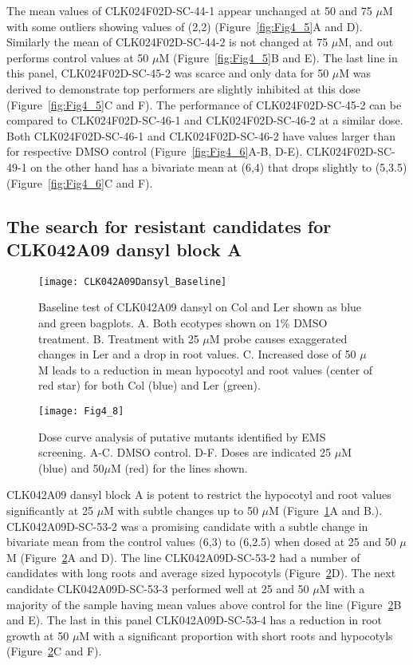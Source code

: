 The mean values of CLK024F02D-SC-44-1 appear unchanged at 50 and 75 $\mu$M with some outliers showing values of (2,2) (Figure~\ref{fig:Fig4_5}A and D). Similarly the mean of CLK024F02D-SC-44-2 is not changed at 75 $\mu$M, and out performs control values at 50 $\mu$M (Figure~\ref{fig:Fig4_5}B and E). The last line in this panel, CLK024F02D-SC-45-2 was scarce and only data for 50 $\mu$M was derived to demonstrate top performers are slightly inhibited at this dose (Figure~\ref{fig:Fig4_5}C and F). The performance of CLK024F02D-SC-45-2 can be compared to CLK024F02D-SC-46-1 and CLK024F02D-SC-46-2 at a similar dose. Both CLK024F02D-SC-46-1 and CLK024F02D-SC-46-2 have values larger than for respective DMSO control (Figure~\ref{fig:Fig4_6}A-B, D-E). CLK024F02D-SC-49-1 on the other hand has a bivariate mean at (6,4) that drops slightly to (5,3.5) (Figure~\ref{fig:Fig4_6}C and F).

\subsection{The search for resistant candidates for CLK042A09 dansyl block A}

\begin{figure}
\centering
\texttt{[image: CLK042A09Dansyl\_Baseline]}
\caption{Baseline test of CLK042A09 dansyl on Col and Ler shown as blue and green bagplots. A. Both ecotypes shown on 1{\%} DMSO treatment. B. Treatment with 25 $\mu$M probe causes exaggerated changes in Ler and a drop in root values. C. Increased dose of 50 $\mu$M leads to a reduction in mean hypocotyl and root values (center of red star) for both Col (blue) and Ler (green).} 
\label{fig:CLK042A09Dansyl_Baseline}
\end{figure}

\begin{figure}
\centering
\texttt{[image: Fig4\_8]}
\caption{Dose curve analysis of putative mutants identified by EMS screening. A-C. DMSO control. D-F. Doses are indicated 25 $\mu$M (blue) and 50$\mu$M (red) for the lines shown.} 
\label{fig:Fig4_8}
\end{figure}

CLK042A09 dansyl block A is potent to restrict the hypocotyl and root values significantly at 25 $\mu$M with subtle changes up to 50 $\mu$M (Figure~\ref{fig:CLK042A09Dansyl_Baseline}A and B.). CLK042A09D-SC-53-2 was a promising candidate with a subtle change in bivariate mean from the control values (6,3) to (6,2.5) when dosed at 25 and 50 $\mu$M (Figure~\ref{fig:Fig4_8}A and D). The line CLK042A09D-SC-53-2 had a number of candidates with long roots and average sized hypocotyls (Figure~\ref{fig:Fig4_8}D). The next candidate CLK042A09D-SC-53-3 performed well at 25 and 50 $\mu$M with a majority of the sample having mean values above control for the line (Figure~\ref{fig:Fig4_8}B and E). The last in this panel CLK042A09D-SC-53-4 has a reduction in root growth at 50 $\mu$M with a significant proportion with short roots and hypocotyls (Figure~\ref{fig:Fig4_8}C and F).

